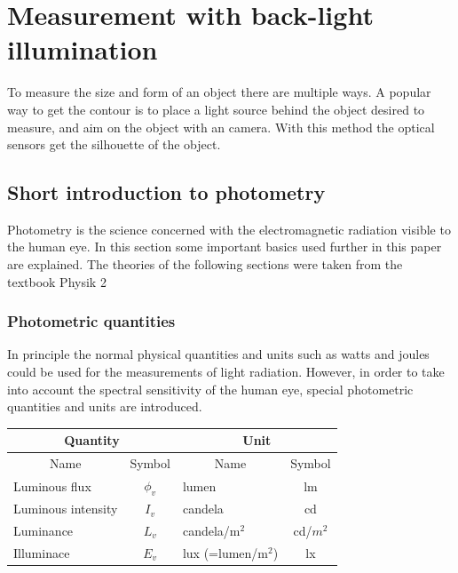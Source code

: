 \section{Measurement with back-light illumination}
To measure the size and form of an object there are multiple ways. A popular way to get the contour is to place a light source behind the object desired to measure, and aim on the object with an camera. With this method the optical sensors get the silhouette of the object. 
\subsection{Short introduction to photometry}
Photometry is the science concerned with the electromagnetic radiation visible to the human eye. In this section some important basics used further in this paper are explained. The theories of the following sections were taken from the textbook Physik 2 \cite{ruh}
\subsubsection{Photometric quantities}
In principle the normal physical quantities and units such as watts and joules could be used for the measurements of light radiation. However, in order to take into account the spectral sensitivity of the human eye, special photometric quantities and units are introduced. 
\begin{table}[ht]
\centering
\begin{tabular}{ |p{5cm} p{2cm}|p{5cm} p{2cm}|  }
	\hline
	\multicolumn{2}{|c}{Quantity}&\multicolumn{2}{|c|}{Unit} \\
	\hline\hline
	\multicolumn{1}{|c}{Name}			& \multicolumn{1}{|c|}{Symbol}	& \multicolumn{1}{c}{Name}	& \multicolumn{1}{|c|}{Symbol}\\

	\hline
	Luminous flux		& \multicolumn{1}{|c|}{$\phi_v$}	& lumen		& \multicolumn{1}{|c|}{lm}\\
	Luminous intensity 	& \multicolumn{1}{|c|}{$I_v$} 		& candela	& \multicolumn{1}{|c|}{cd}\\
	Luminance			& \multicolumn{1}{|c|}{$L_v$}		& candela/$\text{m}^2$	& \multicolumn{1}{|c|}{cd/$m^2$}\\
	Illuminace 			& \multicolumn{1}{|c|}{$E_v$} 		& lux (=lumen/$\text{m}^2$) 	& \multicolumn{1}{|c|}{lx}\\

	\hline
\end{tabular}
\end{table}


